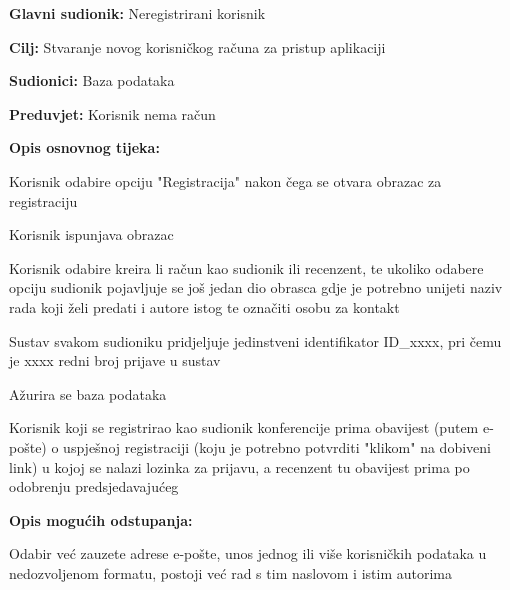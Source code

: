 					\noindent {}
					\begin{packed_item}
	
						\item \textbf{Glavni sudionik: } Neregistrirani korisnik
						\item  \textbf{Cilj:} Stvaranje novog korisničkog računa za pristup aplikaciji
						\item  \textbf{Sudionici:} Baza podataka
						\item  \textbf{Preduvjet:} Korisnik nema račun
						\item  \textbf{Opis osnovnog tijeka:}
						
						\item[] \begin{packed_enum}
	
							\item Korisnik odabire opciju "Registracija" nakon čega se otvara obrazac za registraciju
							\item Korisnik ispunjava obrazac
							\item Korisnik odabire kreira li račun kao sudionik ili recenzent, te ukoliko odabere opciju sudionik pojavljuje se još jedan dio obrasca gdje je potrebno unijeti naziv rada koji želi predati i autore istog te označiti osobu za kontakt
							\item Sustav svakom sudioniku pridjeljuje jedinstveni identifikator ID\_xxxx, pri čemu je xxxx redni broj prijave u sustav
							\item Ažurira se baza podataka
							\item Korisnik koji se registrirao kao sudionik konferencije prima obavijest (putem e-pošte) o uspješnoj registraciji (koju je potrebno potvrditi "klikom" na dobiveni link) u kojoj se nalazi lozinka za prijavu, a recenzent tu obavijest prima po odobrenju predsjedavajućeg
							
						\end{packed_enum}

						\item  \textbf{Opis mogućih odstupanja:}
						
						\item[] \begin{packed_item}
	
							\item[2.a]  Odabir već zauzete adrese e-pošte, unos jednog ili više korisničkih podataka u nedozvoljenom formatu, postoji već rad s tim naslovom i istim autorima
							\item[] \begin{packed_enum}
								

\end{packed_enum}
\end{packed_item}
\end{packed_item}
